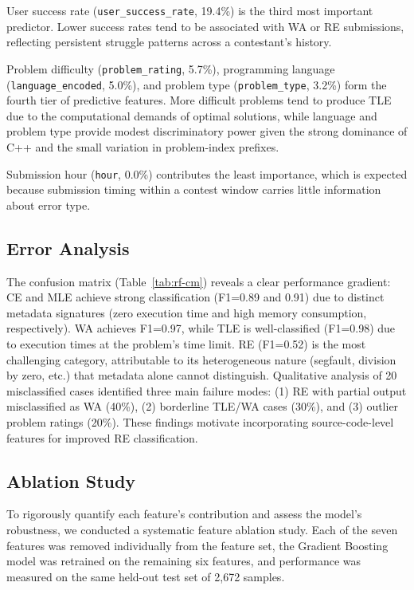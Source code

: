 \documentclass[acmsmall]{acmart}
\begin{document}
User success rate (\texttt{user\_success\_rate}, 19.4\%) is the third most
important predictor. Lower success rates tend to be associated with WA or RE
submissions, reflecting persistent struggle patterns across a contestant's
history.

Problem difficulty (\texttt{problem\_rating}, 5.7\%), programming language
(\texttt{language\_encoded}, 5.0\%), and problem type (\texttt{problem\_type},
3.2\%) form the fourth tier of predictive features. More difficult problems
tend to produce TLE due to the computational demands of optimal
solutions, while language and problem type provide modest discriminatory power
given the strong dominance of C++ and the small variation in problem-index
prefixes.

Submission hour (\texttt{hour}, 0.0\%) contributes the least importance, which
is expected because submission timing within a contest window carries little
information about error type.

\subsection{Error Analysis}

The confusion matrix (Table~\ref{tab:rf-cm}) reveals a clear performance
gradient: CE and MLE achieve strong classification (F1=0.89 and 0.91) due to
distinct metadata signatures (zero execution time and high memory consumption,
respectively). WA achieves F1=0.97, while TLE is well-classified (F1=0.98)
due to execution times at the problem's time limit. RE (F1=0.52) is the most
challenging category, attributable to its heterogeneous nature (segfault,
division by zero, etc.) that metadata alone cannot distinguish. Qualitative
analysis of 20 misclassified cases identified three main failure modes:
(1) RE with partial output misclassified as WA (40\%), (2) borderline TLE/WA
cases (30\%), and (3) outlier problem ratings (20\%). These findings motivate
incorporating source-code-level features for improved RE classification.

\subsection{Ablation Study}
\label{sec:ablation}

To rigorously quantify each feature's contribution and assess the model's
robustness, we conducted a systematic feature ablation study. Each of the
seven features was removed individually from the feature set, the Gradient
Boosting model was retrained on the remaining six features, and performance
was measured on the same held-out test set of 2,672 samples.
\end{document}

